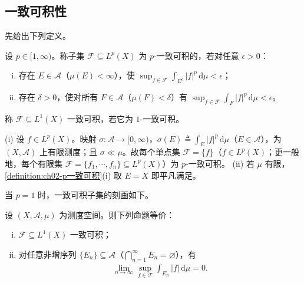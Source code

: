 \documentclass[../../main.tex]{subfiles}%
\begin{document}
\subsection{一致可积性}\label{subsection:ch02-一致可积}

先给出下列定义。

\begin{definition}\label{definition:ch02-p一致可积}\label{definition:ch02-一致可积}
设 $p\in[1,\infty)$。称子集 $\mathscr F\subseteq L^p(X)$ 为 $p$-一致可积的，若对任意 $\epsilon>0$：
\begin{enumerate}[(i)]
\item 存在 $E\in\mathscr A$（$\mu(E)<\infty$），使 $\sup_{f\in\mathscr F}\int_{E^c}|f|^p\,\mathrm{d}\mu<\epsilon$；
\item 存在 $\delta>0$，使对所有 $F\in\mathscr A$（$\mu(F)<\delta$）有 $\sup_{f\in\mathscr F}\int_F|f|^p\,\mathrm{d}\mu<\epsilon$。
\end{enumerate}
称 $\mathscr F\subseteq L^1(X)$ 一致可积，若它为 $1$-一致可积。
\end{definition}

\begin{remark}\label{remark:ch02-单点一致可积}
(i) 设 $f\in L^p(X)$。映射 $\sigma:\mathscr A\to[0,\infty)$，$\sigma(E)\triangleq \int_E|f|^p\,\mathrm{d}\mu$（$E\in\mathscr A$），为 $(X,\mathscr A)$ 上有限测度；且 $\sigma\ll\mu$。故每个单点集 $\mathscr F=\{f\}$（$f\in L^p(X)$；更一般地，每个有限集 $\mathscr F=\{f_1,\cdots ,f_n\}\subseteq L^p(X)$）为 $p$-一致可积。
(ii) 若 $\mu$ 有限，\cref{definition:ch02-p一致可积}(i) 取 $E=X$ 即平凡满足。
\end{remark}

当 $p=1$ 时，一致可积子集的刻画如下。

\begin{proposition}\label{proposition:ch02-一致可积刻画}\label{proposition:ch02-一致可积判据}
设 $(X,\mathscr A,\mu)$ 为测度空间。则下列命题等价：
\begin{enumerate}[(i)]
\item $\mathscr F\subseteq L^1(X)$ 一致可积；
\item 对任意非增序列 $\{E_n\}\subseteq\mathscr A$（$\bigcap_{n=1}^\infty E_n=\varnothing $），有
\begin{align*}
\lim_{n\to\infty}\sup_{f\in\mathscr F}\int_{E_n}|f|\,\mathrm{d}\mu=0.
\end{align*}
\end{enumerate}
\end{proposition}
\end{document}
